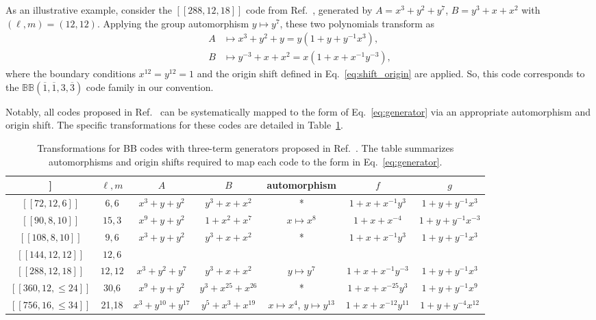 \documentclass[aps,prl,english,superscriptaddress,twocolumn,tightenlines,showpacs,longbibliography,floatfix,amsfonts]{revtex4-2}
\begin{document}
As an illustrative example, consider the $[[288,12,18]]$ code from Ref.~\cite{Bravyi24}, generated by $A = x^3+y^{2}+y^{7}$, $B = y^3+x+x^{2}$ with $(\ell,m)=(12,12)$. Applying the group automorphism $y \mapsto y^{7}$, these two polynomials transform as
\begin{align}
	A &\mapsto x^{3} + y^2 + y = y\left(1+y + y^{-1}x^{3}\right), \\
	B &\mapsto y^{-3} + x + x^{2} = x\left(1+x + x^{-1}y^{-3}\right),
\end{align}
where the boundary conditions $x^{12}=y^{12}=1$ and the origin shift defined in Eq.~\eqref{eq:shift_origin} are applied. So, this code corresponds to the $\mathbb{BB}(\overline{1},\overline{1},3,\overline{3})$ code family in our convention.

Notably, all codes proposed in Ref.~\cite{Bravyi24} can be systematically mapped to the form of Eq.~\eqref{eq:generator} via an appropriate automorphism and origin shift. The specific transformations for these codes are detailed in Table~\ref{tab:ibm_code}.

\begin{table}[h]
	\begin{tabular}{|c|c|c|c|c|c|c|}
		\hline
		[[$n,k,d$]] & $\ell, m$ & $A$ & $B$ & automorphism & $f$ & $g$ \\ \hline
		$[[72,12,6]]$ & $6,6$ & $x^3+y+y^2$ & $y^3+x+x^2$ & * &$1+x+x^{-1}y^3$ & $1+y+y^{-1}x^3$ \\ \hline
		$[[90,8,10]]$ & $15,3$ & $x^9+y+y^2$ & $1+x^2+x^7$ & $x\mapsto x^8$ & $1+x+x^{-4}$ & $1+y+y^{-1}x^{-3}$\\ \hline
		$[[108,8,10]]$ & $9,6$ & \multirow{2}{*}{$x^3+y+y^2$} & \multirow{2}{*}{$y^3+x+x^2$} & \multirow{2}{*}{*} & \multirow{2}{*}{$1+x+x^{-1}y^3$} & \multirow{2}{*}{$1+y+y^{-1}x^3$} \\ \cline{1-2}
		$[[144,12,12]]$ & $12,6$ &  &  &  &  &  \\ \hline
		$[[288,12,18]]$& $12,12$ & $x^3+y^2+y^7$& $y^3+x+x^2$ & $y \mapsto y^7$ & $1+x + x^{-1}y^{-3}$ & $1+y + y^{-1}x^{3}$\\ \hline
		$[[360,12,\leq 24]]$& 30,6 & $x^9+y+y^2$ & $y^3+x^{25}+x^{26}$ & * & $1+x+x^{-25}y^3$ & $1+y+y^{-1}x^9$\\ \hline
		$[[756,16,\leq 34]]$& 21,18 & $x^3+y^{10}+y^{17}$ & $y^5+x^3+x^{19}$ & $x\mapsto x^4$, $y \mapsto y^{13}$ & $1+x + x^{-12}y^{11}$ & $1+y + y^{-4}x^{12}$\\ \hline
	\end{tabular}
	\caption{Transformations for BB codes with three-term generators proposed in Ref.~\cite{Bravyi24}. The table summarizes automorphisms and origin shifts required to map each code to the form in Eq.~\eqref{eq:generator}.}\label{tab:ibm_code}
\end{table}
\end{document}
